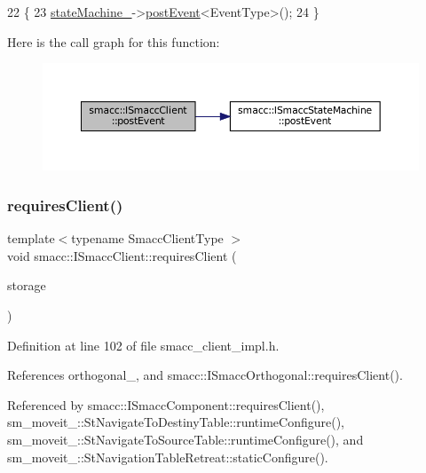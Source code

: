 \begin{DoxyCode}
22     \{
23         \hyperlink{classsmacc_1_1ISmaccClient_a926e4f2ae796def63d48dca389a48c47}{stateMachine\_}->\hyperlink{classsmacc_1_1ISmaccStateMachine_afcb6a216441aeaea2cba4e1ab12c366b}{postEvent}<EventType>();
24     \}
\end{DoxyCode}
Here is the call graph for this function\+:
\nopagebreak
\begin{figure}[H]
\begin{center}
\leavevmode
\includegraphics[width=350pt]{classsmacc_1_1ISmaccClient_a21a79203cb44fc717d4d977c190327c6_cgraph}
\end{center}
\end{figure}
\mbox{\label{classsmacc_1_1ISmaccClient_a7a9990a2f3e35d547671188d69fee520}} 
\subsubsection{\texorpdfstring{requires\+Client()}{requiresClient()}}
{\footnotesize\ttfamily template$<$typename Smacc\+Client\+Type $>$ \\
void smacc\+::\+I\+Smacc\+Client\+::requires\+Client (\begin{DoxyParamCaption}\item[{Smacc\+Client\+Type $\ast$\&}]{storage }\end{DoxyParamCaption})}



Definition at line 102 of file smacc\+\_\+client\+\_\+impl.\+h.



References orthogonal\+\_\+, and smacc\+::\+I\+Smacc\+Orthogonal\+::requires\+Client().



Referenced by smacc\+::\+I\+Smacc\+Component\+::requires\+Client(), sm\+\_\+moveit\+\_\+::\+St\+Navigate\+To\+Destiny\+Table\+::runtime\+Configure(), sm\+\_\+moveit\+\_\+::\+St\+Navigate\+To\+Source\+Table\+::runtime\+Configure(), and sm\+\_\+moveit\+\_\+::\+St\+Navigation\+Table\+Retreat\+::static\+Configure().



